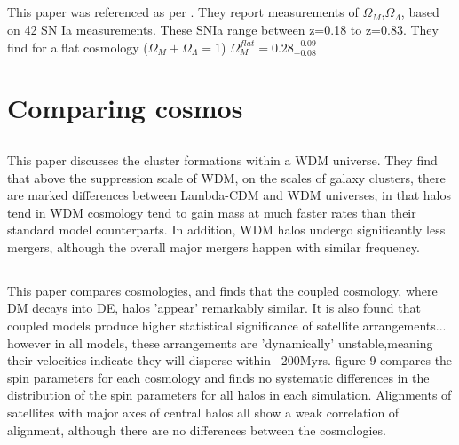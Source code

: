 \documentclass[fleqn,usenatbib]{mnras}
\begin{document}
\subsection{\citet{Perlmutter_99}}
This paper was referenced as per \citet{Riess_98}. They report measurements of $\Omega_{M}$,$\Omega_{\Lambda}$, based on 42 SN Ia measurements. These SNIa range between z=0.18 to z=0.83. 
They find for a flat cosmology ($\Omega_{M}+\Omega_{\Lambda}=1$) $\Omega_{M}^{flat}=0.28^{+0.09}_{-0.08}$

\subsection{\citet{Bennett_13}}

\section{Comparing cosmos}

\subsection{\citet{Elahi_14}}
This paper discusses the cluster formations within a WDM universe. They find that above the suppression scale of WDM, on the scales of galaxy clusters, there are marked differences between Lambda-CDM and WDM universes, in that halos tend in WDM cosmology tend to gain mass at much faster rates than their standard model counterparts. In addition, WDM halos undergo significantly less mergers, although the overall major mergers happen with similar frequency. 

\subsection{\citet{Elahi_15}}
This paper compares cosmologies, and finds that the coupled cosmology, where DM decays into DE, halos 'appear' remarkably similar. It is also found that coupled models produce higher statistical significance of satellite arrangements... however in all models, these arrangements are 'dynamically' unstable,meaning their velocities indicate they will disperse within ~200Myrs. figure 9 compares the spin parameters for each cosmology and finds no systematic differences in the distribution of the spin parameters for all halos in each simulation. Alignments of satellites with major axes of central halos all show a weak correlation of alignment, although there are no differences between the cosmologies. 
\end{document}
